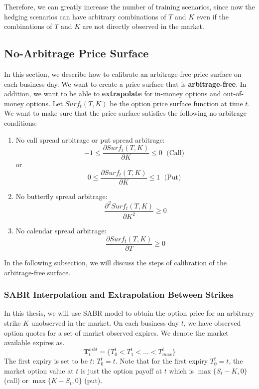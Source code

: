 \documentclass[letterpaper,12pt,titlepage,oneside,final]{book}
\numberwithin{equation}{section}
\theoremstyle{definition}
\begin{document}
Therefore, we can greatly increase the number of training scenarios, since now the hedging scenarios can have arbitrary combinations of $T$ and $K$ even if the combinations of $T$ and $K$ are not directly observed in the market. 

\subsection{No-Arbitrage Price Surface}
\label{sec:NoArb}
In this section, we describe how to calibrate an arbitrage-free price surface on each business day. We want to create a price surface that is \textbf{arbitrage-free}. In addition, we want to be able to \textbf{extrapolate} for  in-money options and out-of-money options. 
Let  $Surf_{t}(T,K)$ be the option price surface function at time $t$. We want to make sure that the price surface satisfies the following no-arbitrage conditions:
\begin{enumerate}
		\item No call spread arbitrage or put spread arbitrage:
		\[
		-1 \leq \frac{\partial Surf_{t}(T,K)}{ \partial K} \leq 0
		\; \text{ (Call) }
		\]
		or
		\[
			0 \leq \frac{\partial Surf_{t}(T,K)}{ \partial K} \leq 1
			\; \text{ (Put) }
		\]
		\item  No butterfly spread arbitrage:
		\[
		\frac{\partial^2 Surf_{t}(T,K)}{ \partial K^2} \geq 0
		\]
		\item  No calendar spread arbitrage:
		\[
		\frac{\partial Surf_{t}(T,K)}{ \partial T} \geq 0
		\]
\end{enumerate}
In the following subsection, we will discuss the steps of calibration of the arbitrage-free surface.
\subsubsection{SABR Interpolation and Extrapolation Between Strikes}
In this thesis, we will use SABR model to obtain the option price for an arbitrary strike $K$ unobserved in the market.
On each business day $t$, we have observed option quotes for a set of market observed expires. We denote the market available expires as.
\[
\mathbf{T}^{mkt}_t=\{ T^{t}_{0}<
T^{t}_1 < \dots< T^{t}_{max}
\}
\]
The first expiry is set to be $t$: $T^{t}_{0}=t$. Note that for the first expiry $T^{t}_{0}=t$, the market option value at $t$ is just the option payoff at $t$ which is $\max\{S_t-K,0\}$ (call) or  $\max\{K-S_t,0\}$ (put). 
\end{document}
